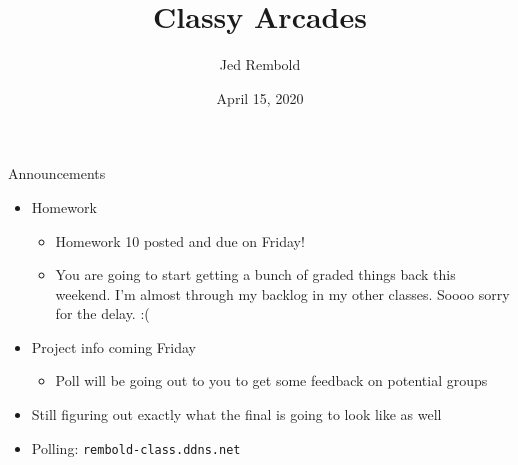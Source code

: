 \documentclass[pdf, aspectratio=169, 12pt]{beamer}
\title{Classy Arcades}
\author{Jed Rembold}
\date{April 15, 2020}
\begin{document}
\begin{frame}{Announcements}
	\begin{itemize}
		\item Homework
			\begin{itemize}
				\item Homework 10 posted and due on Friday!
				\item You are going to start getting a bunch of graded things back this weekend. I'm almost through my backlog in my other classes. \alert{Soooo} sorry for the delay. :(
			\end{itemize}
		\item Project info coming Friday
			\begin{itemize}
				\item Poll will be going out to you to get some feedback on potential groups
			\end{itemize}
		\item Still figuring out exactly what the final is going to look like as well
		\item Polling: \nolinkurl{rembold-class.ddns.net}
	\end{itemize}
\end{frame}
\end{document}
